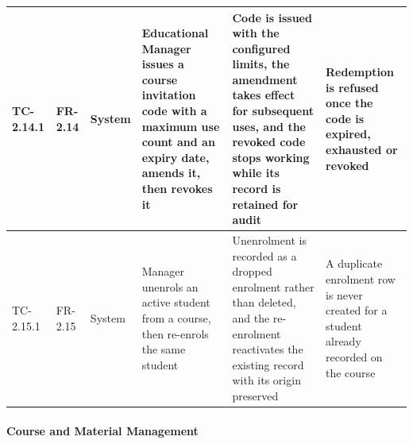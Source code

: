 \begin{longtable}{|>{\centering\arraybackslash}m{}|>{\centering\arraybackslash}m{}|>{\centering\arraybackslash}m{}|m{}|m{}|m{}|}
TC-2.14.1 & FR-2.14 & System & Educational Manager issues a course invitation code with a maximum use count and an expiry date, amends it, then revokes it & Code is issued with the configured limits, the amendment takes effect for subsequent uses, and the revoked code stops working while its record is retained for audit & Redemption is refused once the code is expired, exhausted or revoked \\ \hline

TC-2.15.1 & FR-2.15 & System & Manager unenrols an active student from a course, then re-enrols the same student & Unenrolment is recorded as a dropped enrolment rather than deleted, and the re-enrolment reactivates the existing record with its origin preserved & A duplicate enrolment row is never created for a student already recorded on the course \\ \hline

\end{longtable}


\paragraph{Course and Material Management}

